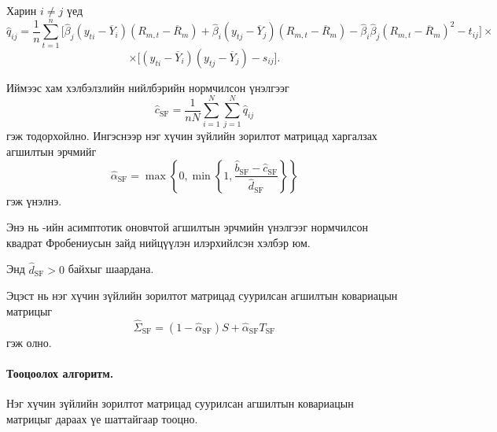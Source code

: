 Харин $i\neq j$ үед
\[
\widehat q_{ij}
=
\frac{1}{n}
\sum_{t=1}^{n}
\Big[
\widehat{\beta}_j
(y_{ti}-\overline{Y}_i)
(R_{m,t}-\overline{R}_m)
+
\widehat{\beta}_i
(y_{tj}-\overline{Y}_j)
(R_{m,t}-\overline{R}_m)
-
\widehat{\beta}_i\widehat{\beta}_j
(R_{m,t}-\overline{R}_m)^2
-t_{ij}
\Big]\times
\]
\[\times
\Big[
(y_{ti}-\overline{Y}_i)
(y_{tj}-\overline{Y}_j)-s_{ij}
\Big].
\]

Иймээс хам хэлбэлзлийн нийлбэрийн
нормчилсон үнэлгээг
\[
\widehat c_{\mathrm{SF}}
=
\frac{1}{nN}
\sum_{i=1}^{N}
\sum_{j=1}^{N}
\widehat q_{ij}
\]
гэж тодорхойлно.
Ингэснээр нэг хүчин зүйлийн зорилтот
матрицад харгалзах агшилтын эрчмийг
\[
\widehat{\alpha}_{\mathrm{SF}}
=
\max
\left\{
0,
\min
\left\{
1,
\frac{
	\widehat b_{\mathrm{SF}}
	-
	\widehat c_{\mathrm{SF}}
}{
	\widehat d_{\mathrm{SF}}
}
\right\}
\right\}
\]
гэж үнэлнэ.

Энэ нь \citet{ledoitwolf2003}-ийн
асимптотик оновчтой агшилтын эрчмийн
үнэлгээг нормчилсон квадрат
Фробениусын зайд нийцүүлэн
илэрхийлсэн хэлбэр юм.

Энд $\widehat d_{\mathrm{SF}}>0$
байхыг шаардана.

Эцэст нь нэг хүчин зүйлийн зорилтот
матрицад суурилсан агшилтын ковариацын
матрицыг
\[
\widehat{\Sigma}_{\mathrm{SF}}
=
(1-\widehat{\alpha}_{\mathrm{SF}})S
+
\widehat{\alpha}_{\mathrm{SF}}T_{\mathrm{SF}}
\]
гэж олно.

\paragraph{Тооцоолох алгоритм.}

Нэг хүчин зүйлийн зорилтот матрицад
суурилсан агшилтын ковариацын
матрицыг дараах үе шаттайгаар тооцно.

